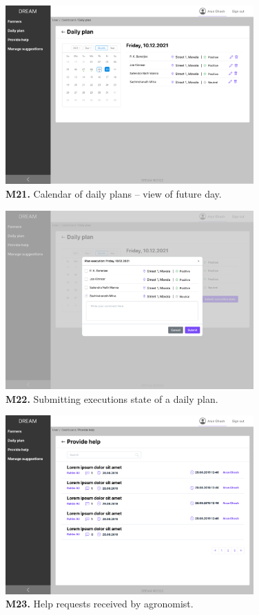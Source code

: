 \begin{figure}[H]
    \centering
    \includegraphics[width=0.85\textwidth]{mockups/Agronomist_Dashboard_Visit plan in future.png}
    \caption{\textbf{M21.} Calendar of daily plans – view of future day.}
\end{figure}

\begin{figure}[H]
    \centering
    \includegraphics[width=0.85\textwidth]{mockups/Agronomist_Dashboard_Visit plan_Submit.png}
    \caption{\textbf{M22.} Submitting executions state of a daily plan.}
\end{figure}

\begin{figure}[H]
    \centering
    \includegraphics[width=0.85\textwidth]{mockups/Agronomist_Dashboard_Provide help.png}
    \caption{\textbf{M23.} Help requests received by agronomist.}
\end{figure}

